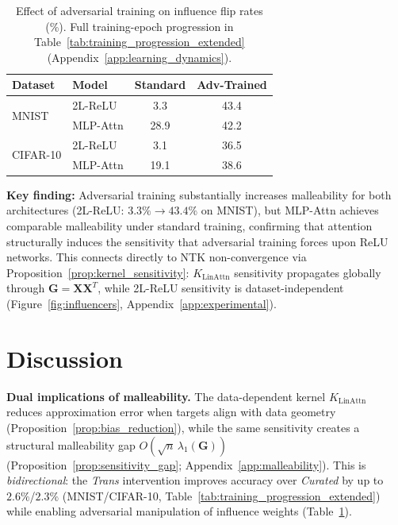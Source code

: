\documentclass{article}
\theoremstyle{plain}
\theoremstyle{definition}
\theoremstyle{remark}
\begin{document}
\begin{table}[t]
\caption{Effect of adversarial training on influence flip rates (\%). Full training-epoch progression in Table~\ref{tab:training_progression_extended} (Appendix~\ref{app:learning_dynamics}).}
\label{tab:adv_training}
\vskip 0.1in
\begin{center}
\begin{small}
\begin{tabular}{llcc}
\toprule
\textbf{Dataset} & \textbf{Model} & \textbf{Standard} & \textbf{Adv-Trained} \\
\midrule
\multirow{2}{*}{MNIST} & 2L-ReLU & 3.3 & 43.4 \\
& MLP-Attn & 28.9 & 42.2 \\
\midrule
\multirow{2}{*}{CIFAR-10} & 2L-ReLU & 3.1 & 36.5 \\
& MLP-Attn & 19.1 & 38.6 \\
\bottomrule
\end{tabular}
\end{small}
\end{center}
\vskip -0.1in
\end{table}

\textbf{Key finding:} Adversarial training substantially increases malleability for both architectures (2L-ReLU: $3.3\%\to 43.4\%$ on MNIST), but MLP-Attn achieves comparable malleability under standard training, confirming that attention structurally induces the sensitivity that adversarial training forces upon ReLU networks. This connects directly to NTK non-convergence via Proposition~\ref{prop:kernel_sensitivity}: $K_{\text{LinAttn}}$ sensitivity propagates globally through $\mathbf{G}=\mathbf{X}\mathbf{X}^T$, while 2L-ReLU sensitivity is dataset-independent (Figure~\ref{fig:influencers}, Appendix~\ref{app:experimental}).

\section{Discussion}
\label{sec:discussion}

\textbf{Dual implications of malleability.} The data-dependent kernel $K_{\text{LinAttn}}$ reduces approximation error when targets align with data geometry (Proposition~\ref{prop:bias_reduction}), while the same sensitivity creates a structural malleability gap $O(\sqrt{n}\,\lambda_1(\mathbf{G}))$ (Proposition~\ref{prop:sensitivity_gap}; Appendix~\ref{app:malleability}). This is \emph{bidirectional}: the \emph{Trans} intervention improves accuracy over \emph{Curated} by up to $2.6\%$/$2.3\%$ (MNIST/CIFAR-10, Table~\ref{tab:training_progression_extended}) while enabling adversarial manipulation of influence weights (Table~\ref{tab:adv_training}).
\end{document}
